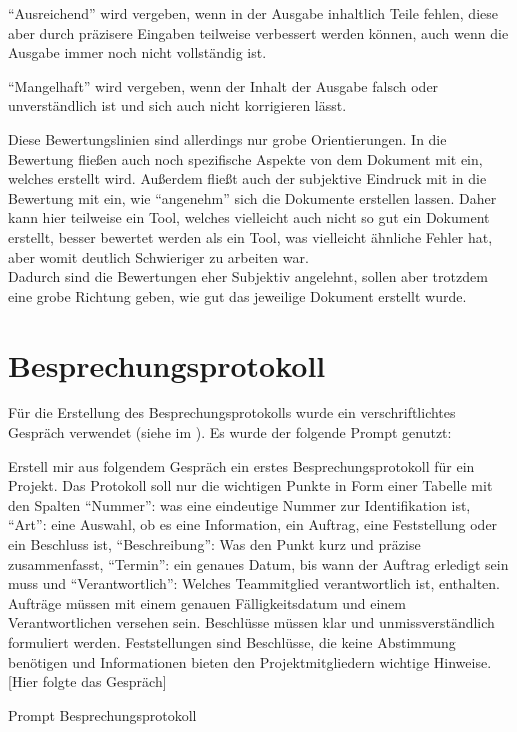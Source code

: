 ``Ausreichend'' wird vergeben, wenn in der Ausgabe inhaltlich Teile fehlen, diese aber durch präzisere Eingaben 
teilweise verbessert werden können, auch wenn die Ausgabe immer noch nicht vollständig ist.

``Mangelhaft'' wird vergeben, wenn der Inhalt der Ausgabe falsch oder unverständlich ist und sich 
auch nicht korrigieren lässt.

Diese Bewertungslinien sind allerdings nur grobe Orientierungen. In die Bewertung fließen auch noch spezifische 
Aspekte von dem Dokument mit ein, welches erstellt wird. Außerdem fließt auch der subjektive Eindruck mit in die 
Bewertung mit ein, wie ``angenehm'' sich die Dokumente erstellen lassen. Daher kann hier teilweise ein Tool, welches 
vielleicht auch nicht so gut ein Dokument erstellt, besser bewertet werden als ein Tool, was vielleicht ähnliche 
Fehler hat, aber womit deutlich Schwieriger zu arbeiten war.\\
Dadurch sind die Bewertungen eher Subjektiv angelehnt, sollen aber trotzdem eine grobe Richtung geben, wie gut das 
jeweilige Dokument erstellt wurde.


\section{Besprechungsprotokoll}  \label{CompBesprechungsprotokoll}

Für die Erstellung des Besprechungsprotokolls wurde ein verschriftlichtes Gespräch verwendet 
(siehe  im ). Es wurde der folgende Prompt 
genutzt:

\begin{prompt}[H]
    \begin{tcolorbox}[colback=gray!20, colframe=gray!20, boxrule=0pt, sharp corners] 
        Erstell mir aus folgendem Gespräch ein erstes Besprechungsprotokoll für ein Projekt. Das Protokoll soll nur 
        die wichtigen Punkte in Form einer Tabelle mit den Spalten ``Nummer'': was eine eindeutige Nummer zur 
        Identifikation ist, ``Art'': eine Auswahl, ob es eine Information, ein Auftrag, eine Feststellung oder ein 
        Beschluss ist, ``Beschreibung'': Was den Punkt kurz und präzise zusammenfasst, ``Termin'': ein genaues Datum, bis 
        wann der Auftrag erledigt sein muss und ``Verantwortlich'': Welches Teammitglied verantwortlich ist, enthalten. 
        Aufträge müssen mit einem genauen Fälligkeitsdatum und einem Verantwortlichen versehen sein. Beschlüsse 
        müssen klar und unmissverständlich formuliert werden. Feststellungen sind Beschlüsse, die keine Abstimmung 
        benötigen und Informationen bieten den Projektmitgliedern wichtige Hinweise. 
        [Hier folgte das Gespräch]
        \vfill
    \end{tcolorbox}
    \caption{Prompt Besprechungsprotokoll}
    \label{Prompt Besprechungsprotokoll}
\end{prompt}


